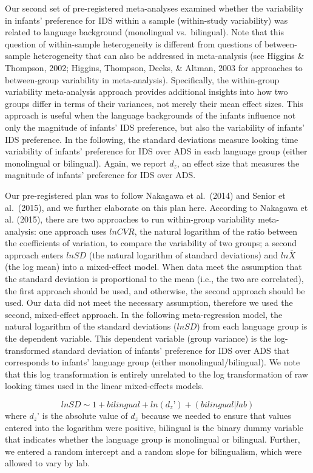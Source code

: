 \documentclass[
  english,
  ,man,floatsintext]{apa6}
\begin{document}
Our second set of pre-registered meta-analyses examined whether the variability in infants' preference for IDS within a sample (within-study variability) was related to language background (monolingual vs.~bilingual). Note that this question of within-sample heterogeneity is different from questions of between-sample heterogeneity that can also be addressed in meta-analysis (see Higgins \& Thompson, 2002; Higgins, Thompson, Deeks, \& Altman, 2003 for approaches to between-group variability in meta-analysis). Specifically, the within-group variability meta-analysis approach provides additional insights into how two groups differ in terms of their variances, not merely their mean effect sizes. This approach is useful when the language backgrounds of the infants influence not only the magnitude of infants' IDS preference, but also the variability of infants' IDS preference. In the following, the standard deviations measure looking time variability of infants' preference for IDS over ADS in each language group (either monolingual or bilingual). Again, we report \(d_z\), an effect size that measures the magnitude of infants' preference for IDS over ADS.

Our pre-registered plan was to follow Nakagawa et al.~(2014) and Senior et al.~(2015), and we further elaborate on this plan here. According to Nakagawa et al. (2015), there are two approaches to run within-group variability meta-analysis: one approach uses \(lnCVR\), the natural logarithm of the ratio between the coefficients of variation, to compare the variability of two groups; a second approach enters \(lnSD\) (the natural logarithm of standard deviations) and \(ln\bar{X}\) (the log mean) into a mixed-effect model. When data meet the assumption that the standard deviation is proportional to the mean (i.e., the two are correlated), the first approach should be used, and otherwise, the second approach should be used. Our data did not meet the necessary assumption, therefore we used the second, mixed-effect approach. In the following meta-regression model, the natural logarithm of the standard deviations (\(lnSD\)) from each language group is the dependent variable. This dependent variable (group variance) is the log-transformed standard deviation of infants' preference for IDS over ADS that corresponds to infants' language group (either monolingual/bilingual). We note that this log transformation is entirely unrelated to the log transformation of raw looking times used in the linear mixed-effects models.

\[lnSD \sim 1 + bilingual + ln(d_z’) + (bilingual | lab)\]
where \(d_z’\) is the absolute value of \(d_z\) because we needed to ensure that values entered into the logarithm were positive, bilingual is the binary dummy variable that indicates whether the language group is monolingual or bilingual. Further, we entered a random intercept and a random slope for bilingualism, which were allowed to vary by lab.
\end{document}

